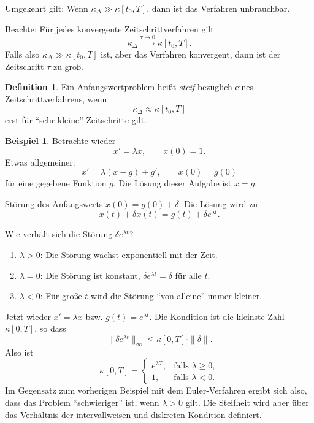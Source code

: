 \documentclass[
 a4paper,
 12pt,
 parskip=half
 ]{scrreprt}
\theoremstyle{plain}
\theoremstyle{definition}
\numberwithin{rmrk}{chapter}
\numberwithin{defn}{chapter}
\numberwithin{exmp}{chapter}
\numberwithin{prgp}{subsection}
\newtheorem*{exmp*}{Beispiel}
\newtheorem*{defn*}{Definition}
\numberwithin{equation}{chapter}
\begin{document}
Umgekehrt gilt: Wenn $\kappa_\Delta \gg \kappa[t_0,T]$, dann ist das Verfahren
unbrauchbar.

Beachte: Für jedes konvergente Zeitschrittverfahren gilt
\[ \kappa_\Delta \xrightarrow{\tau \to 0} \kappa[t_0,T]. \]
Falls also $\kappa_\Delta \gg \kappa[t_0,T]$ ist, aber das Verfahren konvergent,
dann ist der Zeitschritt $\tau$ zu groß.

\begin{defn*}
  Ein Anfangswertproblem heißt \emph{steif} bezüglich eines
  Zeitschrittverfahrens, wenn
  \[ \kappa_\Delta \approx \kappa[t_0,T] \]
  erst für ``sehr kleine'' Zeitschritte gilt.
\end{defn*}

\begin{exmp*}
  Betrachte wieder
  \[ x' = \lambda x, \qquad x(0) = 1. \]
  Etwas allgemeiner:
  \[ x' = \lambda (x-g) + g', \qquad x(0) = g(0) \]
  für eine gegebene Funktion $g$. Die Lösung dieser Aufgabe ist $x = g$.

  Störung des Anfangswerts $x(0) = g(0) + \delta$. Die Lösung wird zu
  \[ x(t) + \delta x(t) = g(t) + \delta e^{\lambda t}. \]

  Wie verhält sich die Störung $\delta e^{\lambda t}$?
  \begin{enumerate}
  \item $\lambda > 0$: Die Störung wächst exponentiell mit der Zeit.
  \item $\lambda = 0$: Die Störung ist konstant, $\delta e^{\lambda t} =
    \delta$ für alle $t$.
  \item $\lambda < 0$: Für große $t$ wird die Störung ``von alleine'' immer
    kleiner.
  \end{enumerate}

  Jetzt wieder $x' = \lambda x$ bzw. $g(t) = e^{\lambda t}$. Die Kondition ist
  die kleinste Zahl $\kappa[0,T]$, so dass
  \[ \| \delta e^{\lambda t} \|_\infty \le \kappa[0,T] \cdot \| \delta \|. \]
  Also ist
  \[ \kappa[0,T] = \begin{cases}
      e^{\lambda T}, &\text{falls } \lambda \ge 0, \\
      1, &\text{falls } \lambda < 0.
    \end{cases}
  \]
  Im Gegensatz zum vorherigen Beispiel mit dem Euler-Verfahren ergibt sich also,
  dass das Problem ``schwieriger'' ist, wenn $\lambda > 0$ gilt. Die Steifheit
  wird aber über das Verhältnis der intervallweisen und diskreten Kondition
  definiert.


\end{exmp*}
\end{document}
